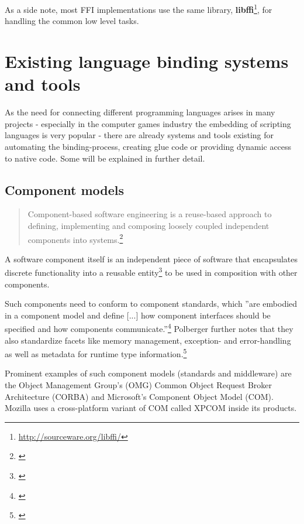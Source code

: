 As a side note, most FFI implementations use the same library, \textbf{libffi}\footnote{\url{http://sourceware.org/libffi/}}, for handling the common low level tasks.


\section{Existing language binding systems and tools}

As the need for connecting different programming languages arises in many projects - especially in the computer games industry the embedding of scripting languages is very popular - there are already systems and tools existing for automating the binding-process, creating glue code or providing dynamic access to native code. Some will be explained in further detail.

\subsection{Component models}

\begin{quotation}
Component-based software engineering is a reuse-based approach to defining, implementing and composing loosely coupled independent components into systems.\footnote{\citep[460]{Sommerville}}
\end{quotation}

A software component itself is an independent piece of software that encapsulates discrete functionality into a reusable entity\footnote{\citep[3]{ComponentTechnology}} to be used in composition with other components.

Such components need to conform to component standards, which ''are embodied in a component model and define [...] how component interfaces should be specified and how components communicate.''\footnote{\citep[440]{Sommerville}} Polberger further notes that they also standardize facets like memory management, exception- and error-handling as well as metadata for runtime type information.\footnote{\citep[8]{ComponentTechnology}}

Prominent examples of such component models (standards and middleware) are the Object Management Group's (OMG) Common Object Request Broker Architecture (CORBA) and Microsoft's Component Object Model (COM). Mozilla uses a cross-platform variant of COM called XPCOM inside its products.

